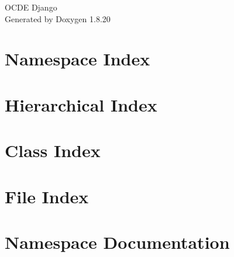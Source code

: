 \let\mypdfximage\pdfximage\def\pdfximage{\immediate\mypdfximage}\documentclass[twoside]{book}
\newcommand{\+}{\discretionary{\mbox{\scriptsize$\hookleftarrow$}}{}{}}
\newcommand{\clearemptydoublepage}{%
  \newpage{\pagestyle{empty}\cleardoublepage}%
}
\begin{document}
\hypersetup{pageanchor=false,
             bookmarksnumbered=true,
             pdfencoding=unicode
            }
\begin{titlepage}
\vspace*{7cm}
\begin{center}%
{\Large O\+C\+DE Django }\\
\vspace*{1cm}
{\large Generated by Doxygen 1.8.20}\\
\end{center}
\end{titlepage}
\clearemptydoublepage
{}
\tableofcontents
\clearemptydoublepage
{}
\hypersetup{pageanchor=true}

\chapter{Namespace Index}

\chapter{Hierarchical Index}

\chapter{Class Index}

\chapter{File Index}

\chapter{Namespace Documentation}






























\end{document}
